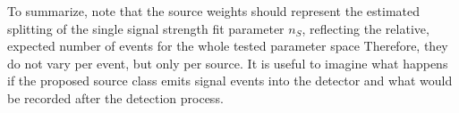 To summarize, note that the source weights should represent the estimated splitting of the single signal strength fit parameter $n_S$, reflecting the relative, expected number of events for the whole tested parameter space
Therefore, they do not vary per event, but only per source.
It is useful to imagine what happens if the proposed source class emits signal events into the detector and what would be recorded after the detection process.



